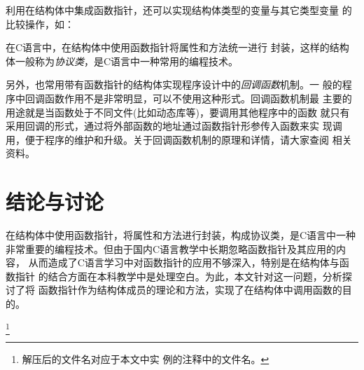 \documentclass[scheme=chinese, heading = true, UTF8]{ctexart}
\begin{document}
利用在结构体中集成函数指针，还可以实现结构体类型的变量与其它类型变量
的比较操作，如：

\begin{mdframed}
\end{mdframed}

在C语言中，在结构体中使用函数指针将属性和方法统一进行
封装，这样的结构体一般称为\emph{协议类}，是C语言中一种常用的编程技术。

另外，也常用带有函数指针的结构体实现程序设计中的\emph{回调函数}机制。一
般的程序中回调函数作用不是非常明显，可以不使用这种形式。回调函数机制最
主要的用途就是当函数处于不同文件(比如动态库等)，要调用其他程序中的函数
就只有采用回调的形式，通过将外部函数的地址通过函数指针形参传入函数来实
现调用，便于程序的维护和升级。关于回调函数机制的原理和详情，请大家查阅
相关资料。
\section{结论与讨论}\label{sec-concolution}
在结构体中使用函数指针，将属性和方法进行封装，构成协议类，是C语言中一种
非常重要的编程技术。但由于国内C语言教学中长期忽略函数指针及其应用的内容，
从而造成了C语言学习中对函数指针的应用不够深入，特别是在结构体与函数指针
的结合方面在本科教学中是处理空白。为此，本文针对这一问题，分析探讨了将
函数指针作为结构体成员的理论和方法，实现了在结构体中调用函数的目的。


\vfill
{}\footnote{解压后的文件名对应于本文中实
  例的注释中的文件名。}



\end{document}
